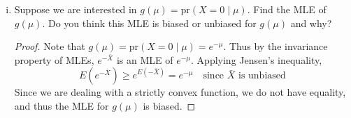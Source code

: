 \documentclass[letterpaper, 12pt]{article}
\newcommand{\pr}{\text{pr}}
\newcommand{\sbs}{\;|\;} %
\begin{document}
\begin{enumerate}
\begin{enumerate}[(i)]
\begin{proof}
To show that it is a minimal sufficient statistic for $\mu$, we use theorem 6.2.13 in Casella and Berger, pg. 281. Suppose $Y_1, \cdots, Y_{50}$ had the same MLE as $X_1, \cdots, X_{50}$ with $\bar{Y} = \bar{X}$. Then
\begin{align}
\frac{f( \mathbf{x}|\theta)}{f(\mathbf{y} | \theta)} 
&=
\prod_{i=1}^{50}
\frac{\mu^{x_i}}{x_i!} e^{-\mu}
/
\prod_{i=1}^{50}
\frac{\mu^{y_i}}{y_i!} e^{-\mu} \\
&=
\left(\mu^{\sum_{i=1}^{50}x_i}
\prod_{i=1}^{50}
\frac{1}{x_i!} e^{-\mu} \right)
/
\left(\mu^{\sum_{i=1}^{50}y_i}
\prod_{i=1}^{50}
\frac{1}{y_i!} e^{-\mu} \right)\\
&=
\prod_{i=1}^{50}
\frac{1}{x_i!} 
/
\prod_{i=1}^{50}
\frac{1}{y_i!}
\end{align}
since $\sum_{i=1}^{50}x_i = \sum_{i=1}^{50}y_i$. Thus (15) is constant as a function of $\mu$. Now suppose 
\begin{align}
\frac{f( \mathbf{x}|\theta)}{f(\mathbf{y} | \theta)} 
&=
\left(\mu^{\sum_{i=1}^{50}x_i}
\prod_{i=1}^{50}
\frac{1}{x_i!} e^{-\mu} \right)
/
\left(\mu^{\sum_{i=1}^{50}y_i}
\prod_{i=1}^{50}
\frac{1}{y_i!} e^{-\mu} \right) 
\end{align}
is constant as a function of $\mu$. Thus 
\begin{equation}
\mu^{\sum_{i=1}^{50}x_i} = \mu^{\sum_{i=1}^{50}y_i}
\end{equation}
for all $x_i$ and $y_i$. Therefore (19) is equal to a constant, and thus 
\begin{equation}
\sum_{i=1}^{50}x_i = \sum_{i=1}^{50}y_i
\end{equation}
and $\bar{X} = \bar{Y}$. Now by the theorem we conclude that $\bar{X}$ is a minimal sufficient statistic.
\end{proof}
\item
Suppose we are interested in $g(\mu) = \pr(X=0 \sbs \mu)$. Find the MLE of $g(\mu)$. Do you think this MLE is biased or unbiased for $g(\mu)$ and why?
\begin{proof}
Note that $g(\mu) = \pr(X=0 \sbs \mu) = e^{-\mu}$. Thus by the invariance property of MLEs, $e^{-\bar{X}}$ is an MLE of $e^{-\mu}$. Applying Jensen's inequality, 
\begin{equation}
E (e ^{- \bar{X}}) \geq e^{E(-\bar{X})} = e^{-\mu}
\quad \text{since $\bar{X}$ is unbiased}
\end{equation}
Since we are dealing with a strictly convex function, we do not have equality, and thus the MLE for $g(\mu)$ is biased.
\end{proof}

\end{enumerate}
\end{enumerate}
\end{document}
